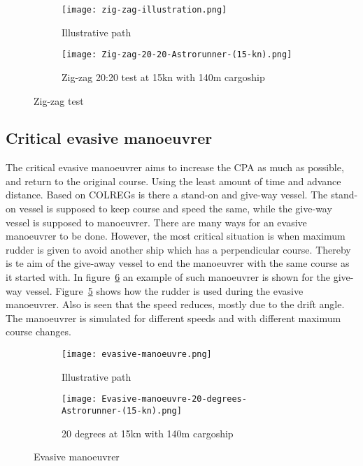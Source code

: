 \begin{figure}[p]
	\begin{subfigure}[b]{0.43\linewidth}
		\centering
		\texttt{[image: zig-zag-illustration.png]}
		\caption{Illustrative path}
		\label{fig:zig-zag-path}
	\end{subfigure} 
	\begin{subfigure}[b]{0.56\linewidth}
		\centering
		\texttt{[image: Zig-zag-20-20-Astrorunner-(15-kn).png]}
		\caption{Zig-zag 20:20 test at 15kn with 140m cargoship}
		\label{fig:zig-zag-astrorunner}
	\end{subfigure}
	\caption{Zig-zag test}
	\label{fig:zig-zag} 
\end{figure}

\newpage

\subsection{Critical evasive manoeuvrer}
\label{sec:evasive-manoeuvrer}
The critical evasive manoeuvrer aims to increase the \acf{CPA} as much as possible, and return to the original course. Using the least amount of time and advance distance. Based on \ac{COLREGs} is there a stand-on and give-way vessel. The stand-on vessel is supposed to keep course and speed the same, while the give-way vessel is supposed to manoeuvrer. 
There are many ways for an evasive manoeuvrer to be done. However, the most critical situation is when maximum rudder is given to avoid another ship which has a perpendicular course. Thereby is te aim of the give-away vessel to end the manoeuvrer with the same course as it started with. In figure~\ref{fig:evasive-manoeuvrer} an example of such manoeuvrer is shown for the give-way vessel. Figure~\ref{fig:astrorunner-evasive-20} shows how the rudder is used during the evasive manoeuvrer. Also is seen that the speed reduces, mostly due to the drift angle. The manoeuvrer is simulated for different speeds and with different maximum course changes. 

\begin{figure}[hbp]
	\begin{subfigure}[b]{0.43\linewidth}
		\centering
		\texttt{[image: evasive-manoeuvre.png]}
		\caption{Illustrative path}
		\label{fig:evasive-manoeuvrer-path}
	\end{subfigure} 
	\begin{subfigure}[b]{0.56\linewidth}
		\centering
		\texttt{[image: Evasive-manoeuvre-20-degrees-Astrorunner-(15-kn).png]}
		\caption{20 degrees at 15kn with 140m cargoship}
		\label{fig:astrorunner-evasive-20}
	\end{subfigure}
	\caption{Evasive manoeuvrer}
	\label{fig:evasive-manoeuvrer} 
\end{figure}
\clearpage

